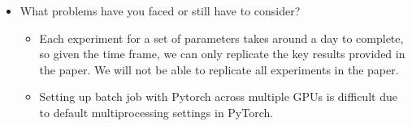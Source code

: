 \begin{itemize}
\begin{itemize}
  \end{itemize}
  \item What problems have you faced or still have to consider?
  \begin{itemize}
      \item Each experiment for a set of parameters takes around a day to complete, so given the time frame, we can only replicate the key results provided in the paper. We will not be able to replicate all experiments in the paper.
      \item Setting up batch job with Pytorch across multiple GPUs is difficult due to default multiprocessing settings in PyTorch.
  \end{itemize}
\end{itemize}

% 
% 
